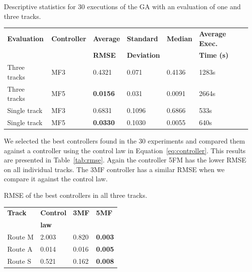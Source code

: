 \documentclass[symmetry,article,submit,moreauthors,pdftex]{Definitions/mdpi}
\begin{document}
\begin{specialtable}[H] 
\small
\caption{Descriptive statistics for 30 executions of the GA with an evaluation
    of one and three tracks.}\label{tab:statistics}
\begin{tabular}{llllll}
\toprule
\textbf{Evaluation} & \textbf{Controller} & \textbf{Average }	& \textbf{Standard } &\textbf{Median}	& \textbf{Average Exec. }\\
                    &                     & \textbf{RMSE}	& \textbf{ Deviation} &\textbf{}	& \textbf{Time (s)}\\
\midrule
Three tracks & MF3 & 0.4321 & 0.071 & 0.4136 & 1283s \\
Three tracks & MF5 & \textbf{0.0156} & 0.031 & 0.0091 & 2664s \\
\midrule
Single track & MF3 & 0.6831 & 0.1096 & 0.6866 & 533s \\
Single track & MF5 & \textbf{0.0330} & 0.1030 & 0.0055 & 640s \\
\bottomrule
\end{tabular}
\end{specialtable}

We selected the best controllers found in the 30 experiments and compared them
against a controller using the control law in Equation~\ref{eq:controller}.
This results are presented in Table~\ref{tab:rmse}. Again the controller 5FM
has the lower RMSE on all individual tracks. The 3MF controller has a similar
RMSE when we compare it against the control law.

\begin{specialtable}[H] 
\small
\caption{RMSE of the best controllers in all three tracks.}\label{tab:rmse}
\begin{tabular}{llll}
\toprule
\textbf{Track}	& \textbf{Control } &\textbf{3MF}	& \textbf{5MF}\\
	& \textbf{law} & & \\
\midrule
Route M & 2.003 & 0.820 & \textbf{0.003} \\
Route A & 0.014 & 0.016 & \textbf{0.005} \\
Route S & 0.521 & 0.162 & \textbf{0.008} \\
\bottomrule
\end{tabular}
\end{specialtable}
\end{document}
